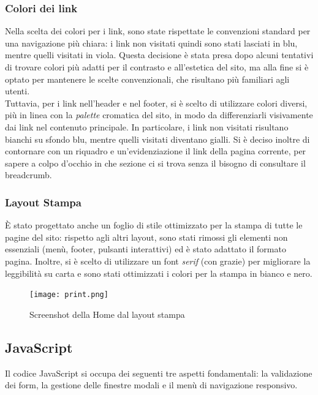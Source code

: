 \documentclass[a4paper, 12pt]{article}
\begin{document}
\begin{justify}
\subsubsection{Colori dei link}

Nella scelta dei colori per i link, sono state rispettate le convenzioni standard per una navigazione più chiara: i link non visitati quindi sono stati lasciati in blu, mentre quelli visitati in viola. Questa decisione è stata presa dopo alcuni tentativi di trovare colori più adatti per il contrasto e all'estetica del sito, ma alla fine si è optato per mantenere le scelte convenzionali, che risultano più familiari agli utenti.\\
Tuttavia, per i link nell'header e nel footer, si è scelto di utilizzare colori diversi, più in linea con la \textit{palette} cromatica del sito, in modo da differenziarli visivamente dai link nel contenuto principale. In particolare, i link non visitati risultano bianchi su sfondo blu, mentre quelli visitati diventano gialli. Si è deciso inoltre di contornare con un riquadro e un'evidenziazione il link della pagina corrente, per sapere a colpo d'occhio in che sezione ci si trova senza il bisogno di consultare il breadcrumb.

\subsubsection{Layout Stampa}

È stato progettato anche un foglio di stile ottimizzato per la stampa di tutte le pagine del sito: rispetto agli altri layout, sono stati rimossi gli elementi non essenziali (menù, footer, pulsanti interattivi) ed è stato adattato il formato pagina. Inoltre, si è scelto di utilizzare un font \textit{serif} (con grazie) per migliorare la leggibilità su carta e sono stati ottimizzati i colori per la stampa in bianco e nero.

\begin{figure}[h]
    \centering
    \texttt{[image: print.png]}
    \caption{Screenshot della Home dal layout stampa}
\end{figure}

\subsection{JavaScript}

Il codice JavaScript si occupa dei seguenti tre aspetti fondamentali: la validazione dei form, la gestione delle finestre modali e il menù di navigazione responsivo.


\end{justify}
\end{document}

